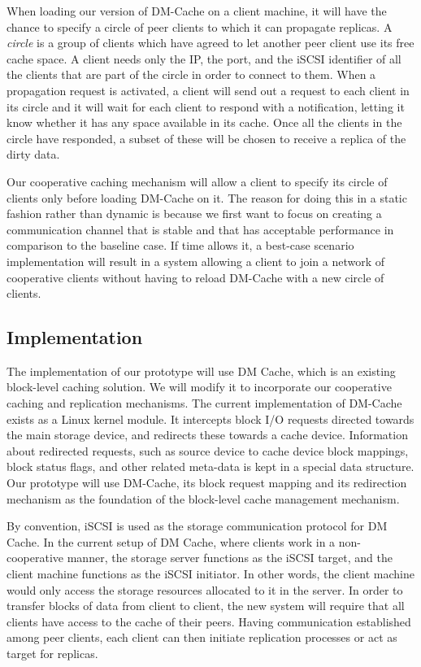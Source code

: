 When loading our version of DM-Cache on a client machine, it
will have the chance to specify a circle of peer clients to
which it can propagate replicas. A \textit{circle} is a group
of clients which have agreed to let another peer client use
its free cache space. A client needs only the IP, the port,
and the iSCSI identifier of all the clients that are part of
the circle in order to connect to them. When a propagation
request is activated, a client will send out a request to each
client in its circle and it will wait for each client to
respond with a notification, letting it know whether it has
any space available in its cache. Once all the clients in the
circle have responded, a subset of these will be chosen to
receive a replica of the dirty data.


Our cooperative caching mechanism will allow a client to specify its circle of
clients only before loading DM-Cache on it. The reason for doing this in a
static fashion rather than dynamic is because we first want to focus on creating
a communication channel that is stable and that has acceptable performance in
comparison to the baseline case. If time allows it, a best-case scenario
implementation will result in a system allowing a client to join a network of
cooperative clients without having to reload DM-Cache with a new circle of clients.


\subsection{Implementation}

The implementation of our prototype will use DM Cache,
which is an existing block-level caching solution. We will
modify it to incorporate our cooperative caching and
replication mechanisms. The current implementation of
DM-Cache exists as a Linux kernel module. It intercepts
block I/O requests directed towards the main storage device,
and redirects these towards a cache device. Information
about redirected requests, such as source device to cache
device block mappings, block status flags, and other
related meta-data is kept in a special data structure. Our
prototype will use DM-Cache, its block request mapping and
its redirection mechanism as the foundation of
the block-level cache management mechanism.

By convention, iSCSI is used as the storage communication
protocol for DM Cache. In the current setup of DM Cache,
where clients work in a non-cooperative manner, the storage
server functions as the iSCSI target, and the client machine
functions as the iSCSI initiator. In other words, the client
machine would only access the storage resources allocated to
it in the server. In order to transfer blocks of data from
client to client, the new system will require that all
clients have access to the cache of their peers. Having
communication established among peer clients, each client can
then initiate replication processes or act as
target for replicas.

